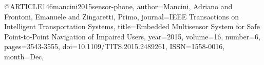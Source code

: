 @ARTICLE{146mancini2015sensor-phone,
author={Mancini, Adriano and Frontoni, Emanuele and Zingaretti, Primo},
journal={IEEE Transactions on Intelligent Transportation Systems}, 
title={Embedded Multisensor System for Safe Point-to-Point Navigation of Impaired Users}, 
year={2015},
volume={16},
number={6},
pages={3543-3555},
doi={10.1109/TITS.2015.2489261},
ISSN={1558-0016},
month={Dec},}